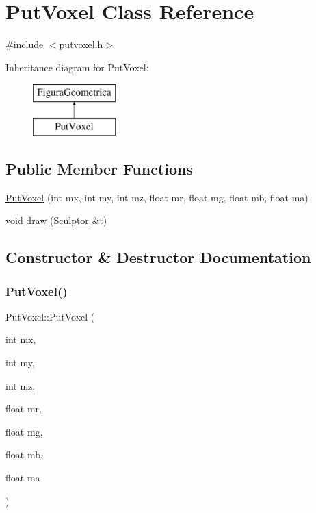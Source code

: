 \hypertarget{class_put_voxel}{}\section{Put\+Voxel Class Reference}
\label{class_put_voxel}


{\ttfamily \#include $<$putvoxel.\+h$>$}

Inheritance diagram for Put\+Voxel\+:\begin{figure}[H]
\begin{center}
\leavevmode
\includegraphics[height=2.000000cm]{class_put_voxel}
\end{center}
\end{figure}
\subsection*{Public Member Functions}
\begin{DoxyCompactItemize}
\item 
\mbox{\hyperlink{class_put_voxel_aedc9b6ffb3a2e28ed0ce06ae5520d923}{Put\+Voxel}} (int mx, int my, int mz, float mr, float mg, float mb, float ma)
\item 
void \mbox{\hyperlink{class_put_voxel_af784ab77d8a7aac2010e608796710ccb}{draw}} (\mbox{\hyperlink{class_sculptor}{Sculptor}} \&t)
\end{DoxyCompactItemize}


\subsection{Constructor \& Destructor Documentation}
\mbox{\label{class_put_voxel_aedc9b6ffb3a2e28ed0ce06ae5520d923}} 
\subsubsection{\texorpdfstring{PutVoxel()}{PutVoxel()}}
{\footnotesize\ttfamily Put\+Voxel\+::\+Put\+Voxel (\begin{DoxyParamCaption}\item[{int}]{mx,  }\item[{int}]{my,  }\item[{int}]{mz,  }\item[{float}]{mr,  }\item[{float}]{mg,  }\item[{float}]{mb,  }\item[{float}]{ma }\end{DoxyParamCaption})}



